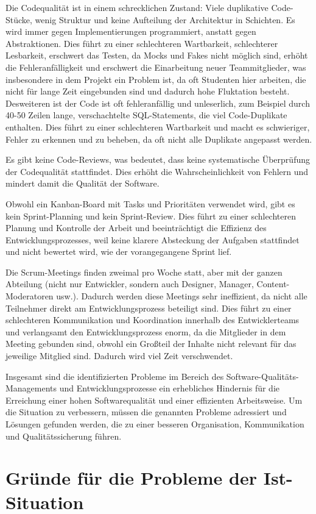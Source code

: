 Die Codequalität ist in einem schrecklichen Zustand: Viele duplikative Code-Stücke, 
wenig Struktur und keine Aufteilung der Architektur in Schichten. 
Es wird immer gegen Implementierungen programmiert, anstatt gegen Abstraktionen. 
Dies führt zu einer schlechteren Wartbarkeit, schlechterer Lesbarkeit, 
erschwert das Testen, da Mocks und Fakes nicht möglich sind,  
erhöht die Fehleranfälligkeit und erschwert die Einarbeitung neuer Teammitglieder, 
was insbesondere in dem Projekt ein Problem ist, da oft Studenten hier arbeiten, 
die nicht für lange Zeit eingebunden sind und dadurch hohe Fluktation besteht. \\
Desweiteren ist der Code ist oft fehleranfällig und unleserlich, 
zum Beispiel durch 40-50 Zeilen lange, 
verschachtelte SQL-Statements, die viel Code-Duplikate enthalten. 
Dies führt zu einer schlechteren Wartbarkeit und macht es schwieriger, 
Fehler zu erkennen und zu beheben, da oft nicht alle Duplikate angepasst werden.

Es gibt keine Code-Reviews, was bedeutet, dass keine systematische Überprüfung der Codequalität 
stattfindet. Dies erhöht die Wahrscheinlichkeit von Fehlern und mindert damit die Qualität der Software.

Obwohl ein Kanban-Board mit Tasks und Prioritäten verwendet wird, 
gibt es kein Sprint-Planning und kein Sprint-Review. 
Dies führt zu einer schlechteren Planung und Kontrolle der Arbeit 
und beeinträchtigt die Effizienz des Entwicklungsprozesses, weil keine klarere Absteckung der 
Aufgaben stattfindet und nicht bewertet wird, wie der vorangegangene Sprint lief.

Die Scrum-Meetings finden zweimal pro Woche statt, 
aber mit der ganzen Abteilung (nicht nur Entwickler, sondern auch Designer, Manager, Content-Moderatoren usw.). 
Dadurch werden diese Meetings sehr ineffizient, 
da nicht alle Teilnehmer direkt am Entwicklungsprozess beteiligt sind. 
Dies führt zu einer schlechteren Kommunikation und Koordination innerhalb des Entwicklerteams 
und verlangsamt den Entwicklungsprozess enorm, da die Mitglieder in dem Meeting gebunden sind, 
obwohl ein Großteil der Inhalte nicht relevant für das jeweilige Mitglied sind. 
Dadurch wird viel Zeit verschwendet.

Insgesamt sind die identifizierten Probleme im Bereich des Software-Qualitäts-Managements
und Entwicklungsprozesse ein erhebliches Hindernis für die Erreichung einer 
hohen Softwarequalität und einer effizienten Arbeitsweise. Um die Situation zu verbessern, 
müssen die genannten Probleme adressiert und Lösungen gefunden werden, 
die zu einer besseren Organisation, Kommunikation und Qualitätssicherung führen.

\section{Gründe für die Probleme der Ist-Situation}